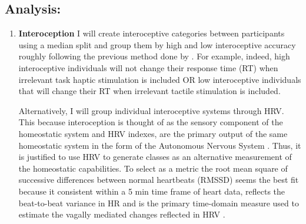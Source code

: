 \documentclass{article}
\begin{document}
\subsection{Analysis:} 
\begin{enumerate}
    \item \textbf{Interoception} I will create interoceptive categories between participants using a median split and group them by high and low interoceptive accuracy roughly following the previous method done by \citep{Tsakiris2011}. For example, indeed, high interoceptive individuals will not change their response time (RT) when irrelevant task haptic stimulation is included OR low interoceptive individuals that will change their RT when irrelevant tactile stimulation is included.
    
    Alternatively, I will group individual interoceptive systems through HRV. This because interoception is thought of as the sensory component of the homeostatic system and HRV indexes, are the primary output of the same homeostatic system in the form of the Autonomous Nervous System  \citep{Pinna2020}. Thus, it is justified to use HRV to generate classes as an alternative measurement of the homeostatic capabilities. To select as a metric the root mean square of successive differences between normal heartbeats (RMSSD) seems the best fit because it consistent within a 5 min time frame of heart data, reflects the beat-to-beat variance in HR and is the primary time-domain measure used to estimate the vagally mediated changes reflected in HRV \cite{Shaffer2017}.    
\end{enumerate}



\end{document}
